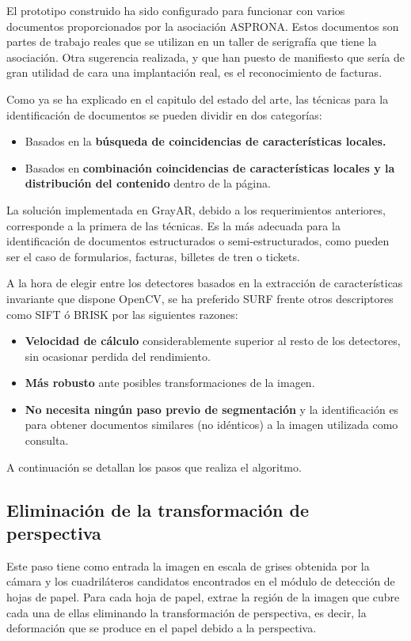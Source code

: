 El prototipo construido ha sido configurado para funcionar con varios documentos proporcionados
por la asociación ASPRONA. Estos documentos son partes de trabajo reales que se utilizan en un
taller de serigrafía que tiene la asociación. Otra sugerencia realizada, y que han puesto de
manifiesto que sería de gran utilidad de cara una implantación real, es el reconocimiento de facturas.

Como ya se ha explicado en el capitulo del estado del arte, las técnicas para la identificación de
documentos se pueden dividir en dos categorías:

\begin{itemize}
\item Basados en la \textbf{búsqueda de coincidencias de características locales.}
\item Basados en \textbf{combinación coincidencias de características locales y la distribución del contenido} dentro de la página.
\end{itemize}

La solución implementada en GrayAR, debido a los requerimientos anteriores, corresponde a la primera
de las técnicas. Es la más adecuada para la identificación de documentos estructurados o
semi-estructurados, como pueden ser el caso de formularios, facturas, billetes de tren o tickets.

A la hora de elegir entre los detectores basados en la extracción de características invariante que
dispone OpenCV, se ha preferido SURF frente otros descriptores como SIFT ó BRISK por las siguientes razones:

\begin{itemize}
\item \textbf{Velocidad de cálculo} considerablemente superior al resto de los detectores, sin ocasionar perdida del rendimiento.
\item \textbf{Más robusto} ante posibles transformaciones de la imagen.
\item \textbf{No necesita ningún paso previo de segmentación} y la identificación es para obtener documentos similares (no
idénticos) a la imagen utilizada como consulta.
\end{itemize}

A continuación se detallan los pasos que realiza el algoritmo.

\subsection{Eliminación de la transformación de perspectiva}
Este paso tiene como entrada la imagen en escala de grises obtenida
por la cámara y los cuadriláteros candidatos encontrados en el módulo
de detección de hojas de papel. Para cada hoja de papel, extrae la
región de la imagen que cubre cada una de ellas eliminando la
transformación de perspectiva, es decir, la deformación que se produce
en el papel debido a la perspectiva.


